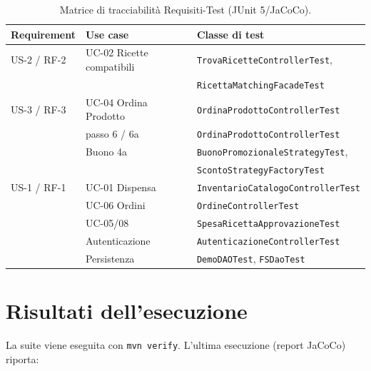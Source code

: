 \begin{table}[H]
    \centering
    \small
    \setlength{\tabcolsep}{4pt}
    \begin{tabular}{@{}llp{4.6cm}@{}} \toprule
        \textbf{Requirement} & \textbf{Use case} & \textbf{Classe di test}\\ \midrule
        US-2 / RF-2 & UC-02 Ricette compatibili & \texttt{TrovaRicetteControllerTest}, \\
        & & \texttt{RicettaMatchingFacadeTest}\\
        US-3 / RF-3 & UC-04 Ordina Prodotto & \texttt{OrdinaProdottoControllerTest}\\
        & passo 6 / 6a & \texttt{OrdinaProdottoControllerTest} \\
        & Buono 4a & \texttt{BuonoPromozionaleStrategyTest}, \\ & & \texttt{ScontoStrategyFactoryTest}\\
        US-1 / RF-1 & UC-01 Dispensa & \texttt{InventarioCatalogoControllerTest}\\
        & UC-06 Ordini & \texttt{OrdineControllerTest}\\
        & UC-05/08 & \texttt{SpesaRicettaApprovazioneTest}\\
        & Autenticazione & \texttt{AutenticazioneControllerTest}\\
        & Persistenza & \texttt{DemoDAOTest}, \texttt{FSDaoTest}\\
        \bottomrule
    \end{tabular}
    \caption{Matrice di tracciabilità Requisiti{-}Test (JUnit 5/JaCoCo).}
    \label{tab:tracciabilita_test}
\end{table}

\section{Risultati dell'esecuzione}
\label{sec:testing_risultati}

La suite viene eseguita con \texttt{mvn verify}. L'ultima esecuzione (report
JaCoCo) riporta:

